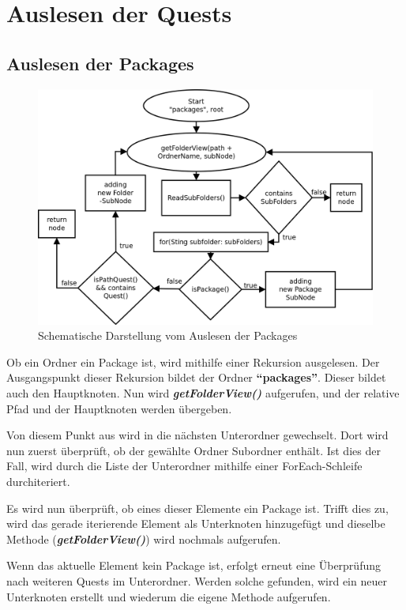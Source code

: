 \section{Auslesen der Quests}
\subsection{Auslesen der Packages}

\begin{figure}[h] 
  \centering
     \includegraphics[width=1\textwidth]{./media/images/gui/package-tree-rekursion.png}
  \caption{Schematische Darstellung vom Auslesen der Packages}
  \label{fig:Package_Tree_Rekursion}
\end{figure}

Ob ein Ordner ein Package ist, wird mithilfe einer Rekursion ausgelesen. Der Ausgangspunkt dieser Rekursion bildet der Ordner \textbf{"`packages"'}. Dieser bildet auch den Hauptknoten. Nun wird \textit{\textbf{getFolderView()}} aufgerufen, und der relative Pfad und der Hauptknoten werden übergeben.

Von diesem Punkt aus wird in die nächsten Unterordner gewechselt. Dort wird nun zuerst überprüft, ob der gewählte Ordner Subordner enthält. Ist dies der Fall, wird durch die Liste der Unterordner mithilfe einer ForEach-Schleife durchiteriert.

Es wird nun überprüft, ob eines dieser Elemente ein Package ist. Trifft dies zu, wird das gerade iterierende Element als Unterknoten hinzugefügt und dieselbe Methode (\textit{\textbf{getFolderView()}}) wird nochmals aufgerufen.

Wenn das aktuelle Element kein Package ist, erfolgt erneut eine Überprüfung nach weiteren Quests im Unterordner. Werden solche gefunden, wird ein neuer Unterknoten erstellt und wiederum die eigene Methode aufgerufen.

